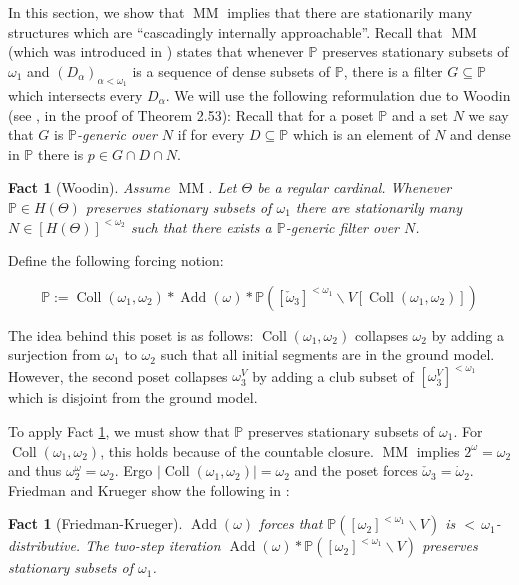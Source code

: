 \documentclass[a4paper]{amsart}
\theoremstyle{definition}
\theoremstyle{remark}
\theoremstyle{plain}
\newtheorem{myfact}[mydef]{Fact}
\numberwithin{mydef}{section}
\DeclareMathOperator{\Add}{Add}
\DeclareMathOperator{\Coll}{Coll}
\DeclareMathOperator{\MM}{MM}
\newcommand{\dP}{\mathbb{P}}
\begin{document}
	In this section, we show that $\MM$ implies that there are stationarily many structures which are ``cascadingly internally approachable''. Recall that $\MM$ (which was introduced in \cite{ForemanMagidorShelahMM}) states that whenever $\dP$ preserves stationary subsets of $\omega_1$ and $(D_{\alpha})_{\alpha<\omega_1}$ is a sequence of dense subsets of $\dP$, there is a filter $G\subseteq\dP$ which intersects every $D_{\alpha}$. We will use the following reformulation due to Woodin (see \cite{WoodinADFANS}, in the proof of Theorem 2.53): Recall that for a poset $\dP$ and a set $N$ we say that $G$ is \emph{$\dP$-generic over $N$} if for every $D\subseteq\dP$ which is an element of $N$ and dense in $\dP$ there is $p\in G\cap D\cap N$.
	
	\begin{myfact}[Woodin]\label{FactWoodin}
		Assume $\MM$. Let $\Theta$ be a regular cardinal. Whenever $\dP\in H(\Theta)$ preserves stationary subsets of $\omega_1$ there are stationarily many $N\in[H(\Theta)]^{<\omega_2}$ such that there exists a $\dP$-generic filter over $N$.
	\end{myfact}
	
	Define the following forcing notion:
	
	$$\dP:=\Coll(\omega_1,\omega_2)*\Add(\omega)*\dP([\check{\omega}_3]^{<\omega_1}\smallsetminus V[\Coll(\omega_1,\omega_2)])$$
	
	The idea behind this poset is as follows: $\Coll(\omega_1,\omega_2)$ collapses $\omega_2$ by adding a surjection from $\omega_1$ to $\omega_2$ such that all initial segments are in the ground model. However, the second poset collapses $\omega_3^V$ by adding a club subset of $[\omega_3^V]^{<\omega_1}$ which is disjoint from the ground model.
	
	To apply Fact \ref{FactWoodin}, we must show that $\dP$ preserves stationary subsets of $\omega_1$. For $\Coll(\omega_1,\omega_2)$, this holds because of the countable closure. $\MM$ implies $2^{\omega}=\omega_2$ and thus $\omega_2^{\omega}=\omega_2$. Ergo $|\Coll(\omega_1,\omega_2)|=\omega_2$ and the poset forces $\check{\omega}_3=\dot{\omega}_2$. Friedman and Krueger show the following in \cite[Proposition 4.3, Theorem 4.4]{FriedmanKruegerThinDisjoint}:
	
	\begin{myfact}[Friedman-Krueger]\label{FactFriedmanKrueger}
		$\Add(\omega)$ forces that $\dP([\omega_2]^{<\omega_1}\smallsetminus V)$ is ${<}\,\omega_1$-distributive. The two-step iteration $\Add(\omega)*\dP([\omega_2]^{<\omega_1}\smallsetminus V)$ preserves stationary subsets of $\omega_1$.
	\end{myfact}
	
\end{document}
